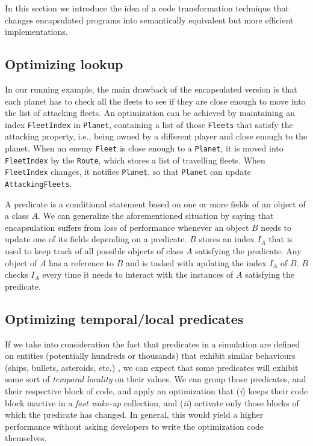 In this section we introduce the idea of a code transformation technique that changes encapsulated programs into semantically equivalent but more efficient implementations.

\subsection{Optimizing lookup}

In our running example, the main drawback of the encapsulated version is that each planet has to check all the fleets to see if they are close enough to move into the list of attacking fleets. An optimization can be achieved by maintaining an index \texttt{FleetIndex} in \texttt{Planet}, containing a list of those \texttt{Fleets} that satisfy the attacking property, i.e., being owned by a different player and close enough to the planet. When an enemy \texttt{Fleet} is close enough to a \texttt{Planet}, it is moved into \texttt{FleetIndex} by the \texttt{Route}, which stores a list of travelling fleets. When \texttt{FleetIndex} changes, it notifies \texttt{Planet}, so that \texttt{Planet} can update \texttt{AttackingFleets}.

A predicate is a conditional statement based on one or more fields of an object of a class $A$. We can generalize the aforementioned situation by saying that encapsulation suffers from loss of performance whenever an object $B$ needs to update one of its fields depending on a predicate. $B$ stores an index $I_{A}$ that is used to keep track of all possible objects of class $A$ satisfying the predicate. Any object of $A$ has a reference to $B$ and is tasked with updating the index $I_{A}$ of $B$. $B$ checks $I_{A}$ every time it needs to interact with the instances of $A$ satisfying the predicate.

\subsection{Optimizing temporal/local predicates}

If we take into consideration the fact that predicates in a simulation are defined on entities (potentially hundreds or thousands) that exhibit similar behaviours (ships, bullets, asteroids, etc.) \cite{ai_dithering}, we can expect that some predicates will exhibit some sort of \textit{temporal locality} on their values. We can group those predicates, and their respective block of code, and apply an optimization that (\textit{i}) keeps their code block inactive in a \textit{fast wake-up} collection, and (\textit{ii}) activate only those blocks of which the predicate has changed. In general, this would yield a higher performance without asking developers to write the optimization code themselves.

